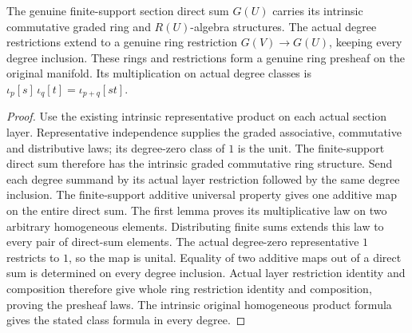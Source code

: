 \begin{definition}
\label{hir:real-domain-actual-normal-associated-section-ring-presheaf}
\leanok
The genuine finite-support section direct sum $G(U)$ carries its intrinsic
commutative graded ring and $R(U)$-algebra structures. The actual degree
restrictions extend to a genuine ring restriction $G(V)\to G(U)$, keeping
every degree inclusion. These rings and restrictions form a genuine ring
presheaf on the original manifold. Its multiplication on actual degree
classes is $\iota_p[s]\,\iota_q[t]=\iota_{p+q}[st]$.
\end{definition}
\begin{proof}
Use the existing intrinsic representative product on each actual section
layer. Representative independence supplies the graded associative,
commutative and distributive laws; its degree-zero class of $1$ is the
unit. The finite-support direct sum therefore has the intrinsic graded
commutative ring structure. Send each degree summand by its actual layer
restriction followed by the same degree inclusion. The finite-support
additive universal property gives one additive map on the entire direct
sum. The first lemma proves its multiplicative law on two arbitrary
homogeneous elements. Distributing finite sums extends this law to every
pair of direct-sum elements. The actual degree-zero representative $1$
restricts to $1$, so the map is unital. Equality of two additive maps out
of a direct sum is determined on every degree inclusion. Actual layer
restriction identity and composition therefore give whole ring
restriction identity and composition, proving the presheaf laws. The
intrinsic original homogeneous product formula gives the stated class
formula in every degree.
\end{proof}

